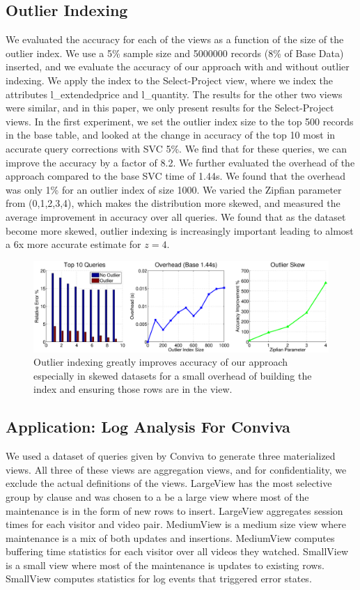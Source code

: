 \subsection{Outlier Indexing}
We evaluated the accuracy for each of the views as a function of the size of the outlier index. 
We use a 5\% sample size and 5000000 records (8\% of Base Data) inserted, and we evaluate the accuracy of our approach with and without outlier indexing.
We apply the index to the Select-Project view, where we index the attributes l\_extendedprice and l\_quantity.
The results for the other two views were similar, and in this paper, we only present results for the Select-Project views.
In the first experiment, we set the outlier index size to the top 500 records in the base table, and looked at the change in accuracy of the top 10 most in accurate query corrections with SVC 5\%.
We find that for these queries, we can improve the accuracy by a factor of  8.2.
We further evaluated the overhead of the approach compared to the base SVC time of 1.44s. 
We found that the overhead was only 1\% for an outlier index of size 1000.
We varied the Zipfian parameter from (0,1,2,3,4), which makes the distribution more skewed, and measured the average improvement in accuracy over all queries.
We found that as the dataset become more skewed, outlier indexing is increasingly important leading to almost a 6x more accurate estimate for $z=4$.

\begin{figure}[ht!]
\label{exp7outlier}
\hspace{-2.8em}
\includegraphics[scale=0.22]{exp/exp6-outlier-full.eps}
 \caption{Outlier indexing greatly improves accuracy of our approach especially in skewed datasets for a small overhead of building the index and ensuring those rows are in the view.}
\end{figure}

\subsection{Application: Log Analysis For Conviva}
We used a dataset of queries given by Conviva to generate three materialized views.
All three of these views are aggregation views, and for confidentiality, we exclude the actual definitions of the views.
LargeView has the most selective group by clause and was chosen to a be a large view where most of the maintenance is in the form of new rows to insert.
LargeView aggregates session times for each visitor and video pair.
MediumView is a medium size view where maintenance is a mix of both updates and insertions.
MediumView computes buffering time statistics for each visitor over all videos they watched.
SmallView is a small view where most of the maintenance is updates to existing rows.
SmallView computes statistics for log events that triggered error states.

